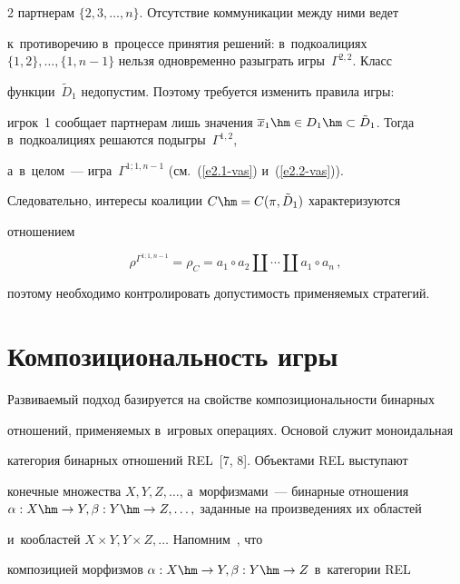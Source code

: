 \begin{multicols}{2}
партнерам $\{2,3,\ldots , n\}$. Отсутствие коммуникации меж\-ду ними ведет 

к~противоречию в~процессе принятия решений: в~подкоалициях $\{1,2\}, \ldots , \{1, 

n-1\}$ нельзя одновременно разыг\-рать игры~$\Gamma^{2,2}$. Класс 

функции~$\tilde{D}_1$ недопустим. Поэтому требуется изменить правила игры: 

игрок~1 сообщает парт\-не\-рам лишь значения $\overline{x}_1\hm\in D_1 \hm\subset 

\tilde{D}_1$. Тогда в~подкоалициях решаются подыг\-ры~$\Gamma^{1,2}$, 

а~в~целом~--- игра~$\Gamma^{1;1,n-1}$ (см.~(\ref{e2.1-vas}) и~(\ref{e2.2-vas})). 

Следовательно, интересы коалиции $C\hm= C(\pi, \tilde{D}_1)$ характеризуются 

отношением 

    \begin{equation}

    \rho^{\Gamma^{1;1,n-1}} =\rho_C= a_1\circ a_2\coprod \cdots \coprod a_1\circ 

a_n\,,

    \label{e2.5-vas}

    \end{equation}

    поэтому необходимо контролировать до\-пус\-ти\-мость применяемых стратегий. 

    

\section{Композициональность игры}



    Развиваемый подход базируется на свойстве ком\-по\-зи\-ци\-о\-наль\-ности бинарных 

отношений, при\-ме\-ня\-емых в~игровых операциях. Основой служит моноидальная 

категория бинарных отношений REL~[7, 8]. Объектами REL вы\-сту\-па\-ют 

конечные множества $X, Y, Z, \ldots$, а~морфизмами~--- бинарные отношения $\alpha: 

X\hm\to Y, \beta: Y\hm\to Z, \ldots ,$ заданные на произведениях их областей 

и~кообластей $X\times Y, Y\times Z, \ldots$ Напомним~\cite{8-vas}, что 

композицией морфизмов $\alpha: X\hm\to Y, \beta: Y\hm\to Z$ в~категории REL 


\end{multicols}
